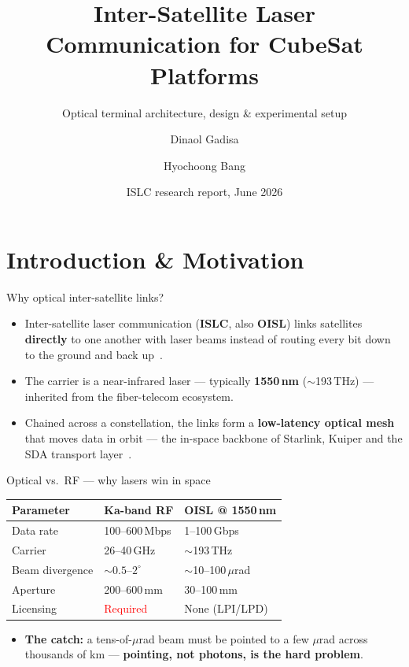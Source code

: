 \documentclass{KAIST-slide}
\title[ISLC for CubeSats] %
{Inter-Satellite Laser Communication for CubeSat Platforms}
\subtitle{Optical terminal architecture, design \& experimental setup}
\author[Dinaol Gadisa] %
{Dinaol Gadisa\inst{1} \and Hyochoong Bang\inst{1}}
\institute[ASCL] %
{
  \inst{1}%
  Aerospace System and Control Lab, Department of Aerospace Engineering, KAIST\\
}
\date[ASCL-P2026] %
{ISLC research report, June 2026}
\newcommand{\ai}{\item[\textcolor{islcteal}{\ding{228}}]}      %
\newcommand{\hi}[1]{\textcolor{islcorange}{\textbf{#1}}}       %
\newcommand{\key}[1]{\textcolor{islcblue}{\textbf{#1}}}        %
\begin{document}
\frame{\titlepage}

\section{Introduction \& Motivation}

\begin{frame}[t,allowframebreaks=1.2]{Why optical inter-satellite links?}
    \begin{itemize}
        \ai Inter-satellite laser communication (\hi{ISLC}, also \hi{OISL}) links satellites \key{directly} to one another with laser beams instead of routing every bit down to the ground and back up~\cite{kaushal2017optical,sodnik2010optical}.
        \ai The carrier is a near-infrared laser --- typically \key{1550\,nm} ($\sim$193\,THz) --- inherited from the fiber-telecom ecosystem.
        \ai Chained across a constellation, the links form a \key{low-latency optical mesh} that moves data in orbit --- the in-space backbone of Starlink, Kuiper and the SDA transport layer~\cite{chaudhry2021free,sda2022oct}.
    \end{itemize}
    \framebreak
    \begin{block}{Optical vs.\ RF --- why lasers win in space~\cite{kaushal2017optical}}
    \centering\footnotesize
    \begin{tabular}{l l l}
        \hline
        \textbf{Parameter} & \textbf{Ka-band RF} & \textbf{OISL @ 1550\,nm}\\
        \hline
        Data rate      & 100--600\,Mbps   & 1--100\,Gbps\\
        Carrier        & 26--40\,GHz      & $\sim$193\,THz\\
        Beam divergence& $\sim0.5$--$2^\circ$ & $\sim$10--100\,$\mu$rad\\
        Aperture       & 200--600\,mm     & 30--100\,mm\\
        Licensing      & \textcolor{red}{Required} & \textcolor{islcteal}{None (LPI/LPD)}\\
        \hline
    \end{tabular}
    \end{block}
    \begin{itemize}
        \ai \hi{The catch:} a tens-of-$\mu$rad beam must be pointed to a few $\mu$rad across thousands of km --- \key{pointing, not photons, is the hard problem}.
    \end{itemize}
\end{frame}
\end{document}
